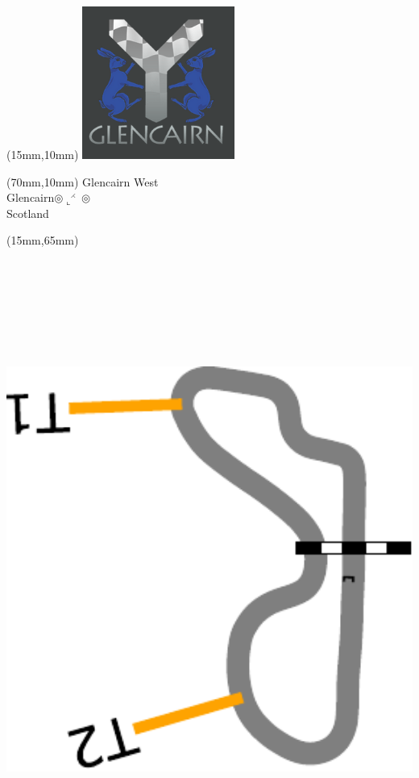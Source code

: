 \null\newpage
\begin{textblock*}{50mm}(15mm,10mm)%
\includegraphics[width=50mm]{LG/GLCN.png}
\end{textblock*}
\begin{textblock*}{130mm}(70mm,10mm)%
{\fontsize{20}{20}\selectfont Glencairn West\\}
{\fontsize{16}{16}\selectfont Glencairn\hfill $\circledcirc\llcorner^{\rightthreetimes}\circledcirc$\\}
{\fontsize{12}{12}\selectfont Scotland\\}
\end{textblock*}
\begin{textblock*}{185mm}(15mm,65mm)%
\centering
\mbox{\includegraphics[width=185mm,height=210mm,keepaspectratio]{PT/GLCNW.pdf}}
\end{textblock*}
